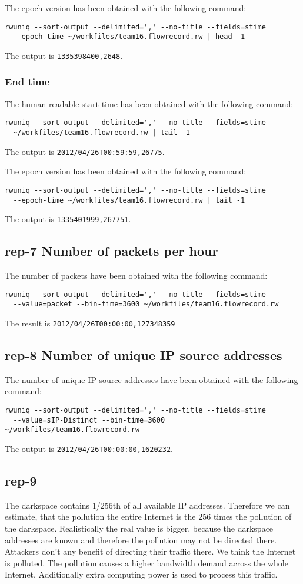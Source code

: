 The epoch version has been obtained with the following command:
\begin{verbatim}
rwuniq --sort-output --delimited=',' --no-title --fields=stime
  --epoch-time ~/workfiles/team16.flowrecord.rw | head -1
\end{verbatim}
The output is \texttt{1335398400,2648}.

\subsubsection*{End time}
The human readable start time has been obtained with the following command:
\begin{verbatim}
rwuniq --sort-output --delimited=',' --no-title --fields=stime
  ~/workfiles/team16.flowrecord.rw | tail -1
\end{verbatim}
The output is \texttt{2012/04/26T00:59:59,26775}.

The epoch version has been obtained with the following command:
\begin{verbatim}
rwuniq --sort-output --delimited=',' --no-title --fields=stime
  --epoch-time ~/workfiles/team16.flowrecord.rw | tail -1
\end{verbatim}
The output is \texttt{1335401999,267751}.


\subsection*{rep-7 Number of packets per hour}
The number of packets have been obtained with the following command:
\begin{verbatim}
rwuniq --sort-output --delimited=',' --no-title --fields=stime
  --value=packet --bin-time=3600 ~/workfiles/team16.flowrecord.rw
\end{verbatim}
The result is \texttt{2012/04/26T00:00:00,127348359}

\subsection*{rep-8 Number of unique IP source addresses}
The number of unique IP source addresses have been obtained with the following command:
\begin{verbatim}
rwuniq --sort-output --delimited=',' --no-title --fields=stime
  --value=sIP-Distinct --bin-time=3600 ~/workfiles/team16.flowrecord.rw
\end{verbatim}
The output is \texttt{2012/04/26T00:00:00,1620232}.

\subsection*{rep-9}
The darkspace contains 1/256th of all available IP addresses. Therefore we can estimate, that the pollution the entire Internet is the 256 times the pollution of the darkspace. Realistically the real value is bigger, because the darkspace addresses are known and therefore the pollution may not be directed there. Attackers don't  any benefit of directing their traffic there. We think the Internet is polluted. The pollution causes a higher bandwidth demand across the whole Internet. Additionally extra computing power is used to process this traffic.
